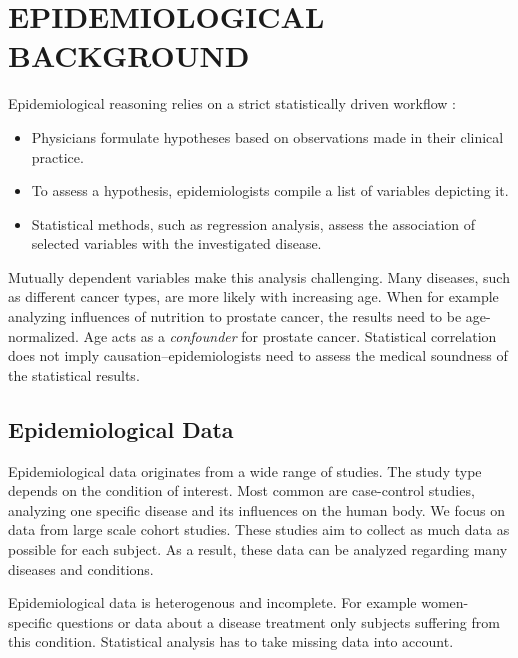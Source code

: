 \documentclass[a4paper,twoside]{style/article}
\newcommand{\com}[1]{\textcolor{orange}{\uline{#1}}}
\begin{document}
\section{\uppercase{Epidemiological Background}}
\label{sec:EpidemiologicalBackground}
\noindent Epidemiological reasoning relies on a strict statistically driven workflow \cite{Fletcher}:
\begin{itemize}
	\item Physicians formulate hypotheses based on observations made in their clinical practice.
	\item To assess a hypothesis, epidemiologists compile a list of variables depicting it.
	\item Statistical methods, such as regression analysis, assess the association of selected variables with the investigated disease.
\end{itemize}
Mutually dependent variables make this analysis challenging.
Many diseases, such as different cancer types, are more likely with increasing age.
When for example analyzing influences of nutrition to prostate cancer, the results need to be age-normalized.
Age acts as a \emph{confounder} for prostate cancer.
Statistical correlation does not imply causation--epidemiologists need to assess the medical soundness of the statistical results.
\subsection{Epidemiological Data}
Epidemiological data originates from a wide range of studies.
The study type depends on the condition of interest.
Most common are case-control studies, analyzing one specific disease and its influences on the human body.
We focus on data from large scale cohort studies.
These studies aim to collect as much data as possible for each subject.
As a result, these data can be analyzed regarding many diseases and conditions.

Epidemiological data is heterogenous and incomplete.
For example women-specific questions or data about a disease treatment only subjects suffering from this condition.
Statistical analysis has to take missing data into account.
\end{document}
